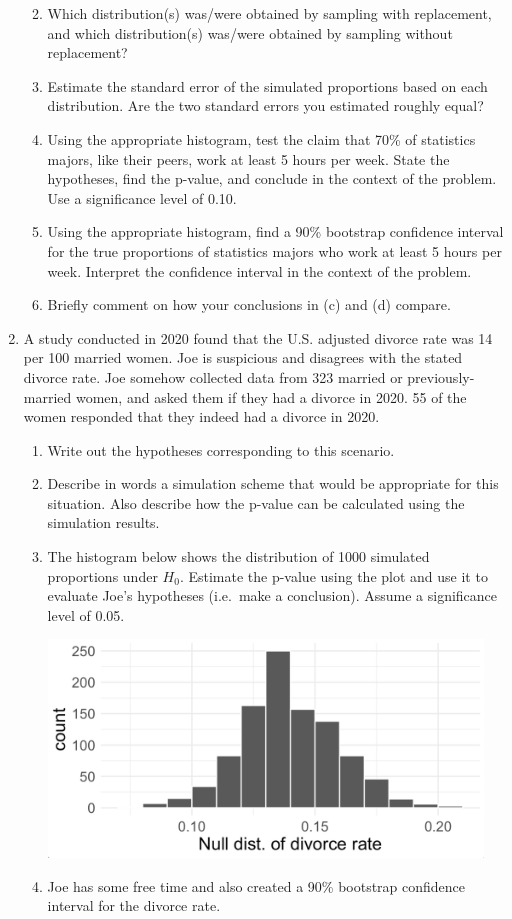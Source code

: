 \documentclass[
  letterpaper,
  DIV=11,
  numbers=noendperiod]{scrartcl}
\begin{document}
\begin{enumerate}
  \begin{enumerate}
  \def\labelenumii{\alph{enumii}.}
  \item
    Which distribution(s) was/were obtained by sampling with
    replacement, and which distribution(s) was/were obtained by sampling
    without replacement?
  \item
    Estimate the standard error of the simulated proportions based on
    each distribution. Are the two standard errors you estimated roughly
    equal?
  \item
    Using the appropriate histogram, test the claim that 70\% of
    statistics majors, like their peers, work at least 5 hours per week.
    State the hypotheses, find the p-value, and conclude in the context
    of the problem. Use a significance level of 0.10.
  \item
    Using the appropriate histogram, find a 90\% bootstrap confidence
    interval for the true proportions of statistics majors who work at
    least 5 hours per week. Interpret the confidence interval in the
    context of the problem.
  \item
    Briefly comment on how your conclusions in (c) and (d) compare.
  \end{enumerate}
\item
  A study conducted in 2020 found that the U.S. adjusted divorce rate
  was 14 per 100 married women. Joe is suspicious and disagrees with the
  stated divorce rate. Joe somehow collected data from 323 married or
  previously-married women, and asked them if they had a divorce in
  2020. 55 of the women responded that they indeed had a divorce in
  2020.

  \begin{enumerate}
  \def\labelenumii{\alph{enumii}.}
  \item
    Write out the hypotheses corresponding to this scenario.
  \item
    Describe in words a simulation scheme that would be appropriate for
    this situation. Also describe how the p-value can be calculated
    using the simulation results.
  \item
    The histogram below shows the distribution of 1000 simulated
    proportions under \(H_{0}\). Estimate the p-value using the plot and
    use it to evaluate Joe's hypotheses (i.e.~make a conclusion). Assume
    a significance level of 0.05.

    \includegraphics[width=4.54167in,height=\textheight]{images/13-divorce.png}
  \item
    Joe has some free time and also created a 90\% bootstrap confidence
    interval for the divorce rate.


\end{enumerate}
\end{enumerate}
\end{document}
